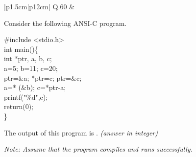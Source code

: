 \documentclass[14pt]{article}
\begin{document}
\vspace{0.3cm}

\begin{tabular}{|p{1.5cm}|p{12cm}|}
\hline
Q.60 &
\parbox[t]{\linewidth}{
Consider the following ANSI-C program.

\vspace{0.3cm}

\ttfamily
\begin{flushleft}
\small
\#include <stdio.h>\\

int main()\{\\
\quad int *ptr, a, b, c;\\
\quad a=5; b=11; c=20;\\
\quad ptr=\&a; *ptr=c; ptr=\&c;\\
\quad a=* (\&b); c=*ptr-a;\\
\quad printf("\%d",c);\\
\quad return(0);\\
\}
\end{flushleft}
\normalfont

The output of this program is \underline{\hspace{2cm}}. \textit{(answer in integer)}

\vspace{0.3cm}

\textit{Note: Assume that the program compiles and runs successfully.}

\vspace{0.35cm}
}
\\
\hline
\end{tabular}

\vspace{0.3cm}
\end{document}
